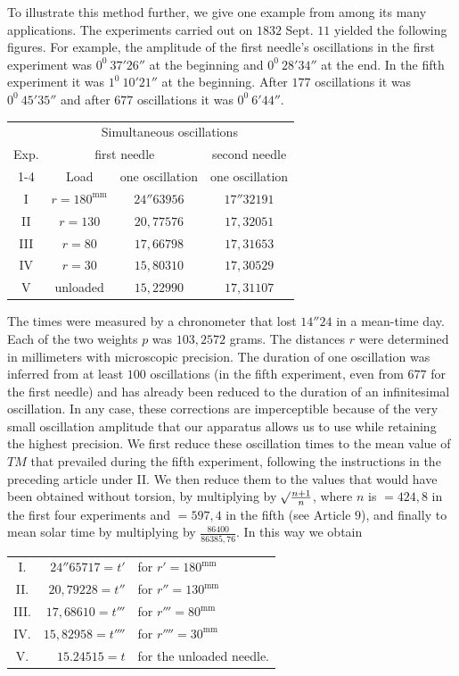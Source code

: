 To illustrate this method further, we give one example from among its many applications. The experiments carried out on $1832$ Sept. $11$ yielded the following figures.
\expandafter\def\csname HistoricalNoteText10\endcsname{For example, the amplitude of the first needle's oscillations in the first experiment was $0^0\ 37'26''$ at the beginning and $0^0\ 28'34''$ at the end. In the fifth experiment it was $1^0\ 10'21''$ at the beginning. After $177$ oscillations it was $0^0\ 45'35''$ and after $677$ oscillations it was $0^0\ 6'44''$.}
\begin{center}
\begin{tabular}{c||c|c||c}
&\multicolumn{3}{c}{Simultaneous oscillations}\\
Exp.&\multicolumn{2}{c||}{first needle}&second needle\\\cline{1-4}
&Load&one oscillation&one oscillation\\
I&$r=180^{\mathrm{mm}}$&$24''63956$&$17''32191$\\
II&$r=130$&$20{,}77576$&$17{,}32051$\\
III&$r=80$&$17{,}66798$&$17{,}31653$\\
IV&$r=30$&$15{,}80310$&$17{,}30529$\\
V&unloaded&$15{,}22990$&$17{,}31107$
\end{tabular}
\end{center}

The times were measured by a chronometer that lost $14''24$ in a mean-time day. Each of the two weights $p$ was $103{,}2572$ grams. The distances $r$ were determined in millimeters with microscopic precision. The duration of one oscillation was inferred from at least $100$ oscillations (in the fifth experiment, even from $677$ for the first needle) and has already been reduced to the duration of an infinitesimal oscillation. In any case, these corrections are imperceptible because of the very small oscillation amplitude that our apparatus allows us to use while retaining the highest precision. We first reduce these oscillation times to the mean value of $TM$ that prevailed during the fifth experiment, following the instructions in the preceding article under II. We then reduce them to the values that would have been obtained without torsion, by multiplying by $\mathord{{}^{}\!\surd}\frac{n+1}{n}$, where $n$ is $=424{,}8$ in the first four experiments and $=597{,}4$ in the fifth (see Article $9$), and finally to mean solar time by multiplying by $\frac{86400}{86385{,}76}$. In this way we obtain
\begin{center}
\begin{tabular}{crl}
I.&$24''65717=t'$&for $r'=180^{\mathrm{mm}}$\\
II.&$20{,}79228=t''$&for $r''=130^{\mathrm{mm}}$\\
III.&$17{,}68610=t'''$&for $r'''=80^{\mathrm{mm}}$\\
IV.&$15{,}82958=t''''$&for $r''''=30^{\mathrm{mm}}$\\
V.&$15.24515=t$&for the unloaded needle.
\end{tabular}
\end{center}

